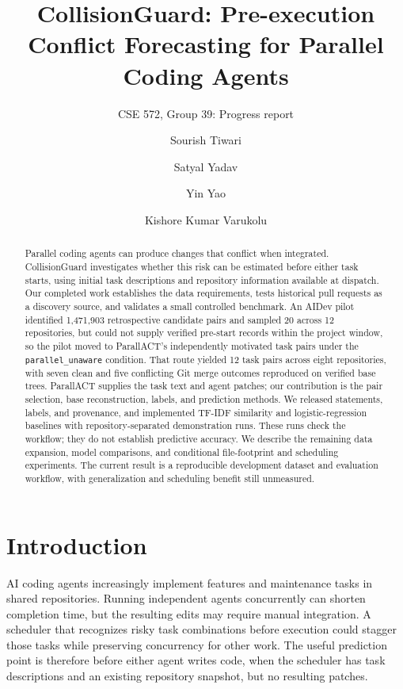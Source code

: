 \documentclass[sigconf,authorversion,nonacm]{acmart}
\title[CollisionGuard progress report]{CollisionGuard: Pre-execution Conflict Forecasting for Parallel Coding Agents}
\subtitle{CSE 572, Group 39: Progress report}
\author{Sourish Tiwari}
\affiliation{\institution{Arizona State University}\city{Tempe}\state{Arizona}\country{USA}}
\author{Satyal Yadav}
\affiliation{\institution{Arizona State University}\city{Tempe}\state{Arizona}\country{USA}}
\author{Yin Yao}
\affiliation{\institution{Arizona State University}\city{Tempe}\state{Arizona}\country{USA}}
\author{Kishore Kumar Varukolu}
\affiliation{\institution{Arizona State University}\city{Tempe}\state{Arizona}\country{USA}}
\begin{document}
\begin{abstract}
Parallel coding agents can produce changes that conflict when integrated. CollisionGuard investigates whether this risk can be estimated before either task starts, using initial task descriptions and repository information available at dispatch. Our completed work establishes the data requirements, tests historical pull requests as a discovery source, and validates a small controlled benchmark. An AIDev pilot identified 1,471,903 retrospective candidate pairs and sampled 20 across 12 repositories, but could not supply verified pre-start records within the project window, so the pilot moved to ParallACT's independently motivated task pairs under the \texttt{parallel\_unaware} condition. That route yielded 12 task pairs across eight repositories, with seven clean and five conflicting Git merge outcomes reproduced on verified base trees. ParallACT supplies the task text and agent patches; our contribution is the pair selection, base reconstruction, labels, and prediction methods. We released statements, labels, and provenance, and implemented TF-IDF similarity and logistic-regression baselines with repository-separated demonstration runs. These runs check the workflow; they do not establish predictive accuracy. We describe the remaining data expansion, model comparisons, and conditional file-footprint and scheduling experiments. The current result is a reproducible development dataset and evaluation workflow, with generalization and scheduling benefit still unmeasured.
\end{abstract}

\maketitle

\section{Introduction}
AI coding agents increasingly implement features and maintenance tasks in shared repositories. Running independent agents concurrently can shorten completion time, but the resulting edits may require manual integration. A scheduler that recognizes risky task combinations before execution could stagger those tasks while preserving concurrency for other work. The useful prediction point is therefore before either agent writes code, when the scheduler has task descriptions and an existing repository snapshot, but no resulting patches.
\end{document}
